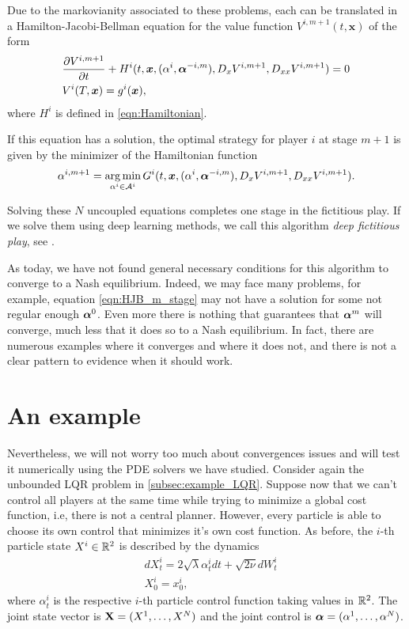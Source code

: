 Due to the markovianity associated to these problems, each can be translated in a Hamilton-Jacobi-Bellman equation for the value function $V^{i,m+1}(t,\bm{x})$ of the form
\begin{equation}
	\label{eqn:HJB_m_stage}
	\begin{split}
		&\frac{\partial V^{i,m+1}}{\partial t}+H^{i}(t,\bm{x},(\alpha^i,\bm{\alpha}^{-i,m}),D_x V^{i,m+1},D_{xx} V^{i,m+1})=0\\
		&V^{i}(T,\bm{x})=g^i(\bm{x}),
	\end{split}
\end{equation}
where $H^{i}$ is defined in \eqref{eqn:Hamiltonian}. 

If this equation has a solution, the optimal strategy for player $i$ at stage $m+1$ is given by the minimizer of the Hamiltonian function
\begin{equation}
	\alpha^{i,m+1}=\operatorname*{arg\,min}_{\alpha^i\in\mathcal{A}^i} G^i(t,\bm{x},(\alpha^i,\bm{\alpha}^{-i,m}),D_x V^{i,m+1},D_{xx} V^{i,m+1}).
\end{equation}

Solving these $N$ uncoupled equations completes one stage in the fictitious play. If we solve them using deep learning methods, we call this algorithm \textit{deep fictitious play}, see \cite{han_deep_2020,hu_recent_nodate}. 

As today, we have not found general necessary conditions for this algorithm to converge to a Nash equilibrium. Indeed, we may face many problems, for example, equation \eqref{eqn:HJB_m_stage} may not have a solution for some not regular enough $\bm{\alpha}^0$. Even more there is nothing that guarantees that $\bm{\alpha}^m$ will converge, much less that it does so to a Nash equilibrium. In fact, there are numerous examples where it converges and where it does not, and there is not a clear pattern to evidence when it should work.
\section{An example}
Nevertheless, we will not worry too much about convergences issues and will test it numerically using the PDE solvers we have studied. 
Consider again the unbounded LQR problem in \autoref{subsec:example_LQR}. Suppose now that we can't control all players at the same time while trying to minimize a global cost function, i.e, there is not a central planner. However, every particle is able to choose its own control that minimizes it's own cost function. As before, the $i$-th particle state $X^i\in \mathbb{R}^2$ is described by the dynamics
\begin{equation}
	\begin{split}
	&dX_t^i=2\sqrt{\lambda} \alpha^i_t dt +\sqrt{2\nu} dW^i_t\\
	&X_0^i=x_0^i,
	\end{split}
\end{equation} 
where $\alpha^i_t$ is the respective $i$-th particle control function taking values in $\mathbb{R}^2$. The joint state vector is $\mathbf{X}=(X^1,\ldots,X^N)$ and the joint control is $\bm{\alpha}=(\alpha^1,\ldots,\alpha^N)$.

